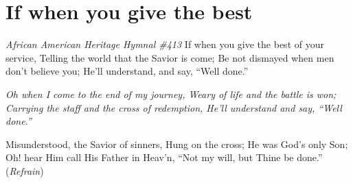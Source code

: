 \starttocol
\chapter{If when you give the best}
\nexttocol
\hfill{\it  African American Heritage Hymnal \#413}
\stoptocol
\startlines
{\sc  If when} you give the best of your service,
Telling the world that the Savior is come;
Be not dismayed when men don't believe you;
He'll understand, and say, ``Well done.''

{\it
Oh when I come to the end of my journey,
Weary of life and the battle is won;
Carrying the staff and the cross of redemption,
He'll understand and say, ``Well done.''}

Misunderstood, the Savior of sinners,
Hung on the cross; He was God's only Son;
Oh! hear Him call His Father in Heav'n,
``Not my will, but Thine be done.''
          \hfill({\it Refrain})~~~~~~~~~~~~~~~~~~~~~~~~~~~
\stoplines
